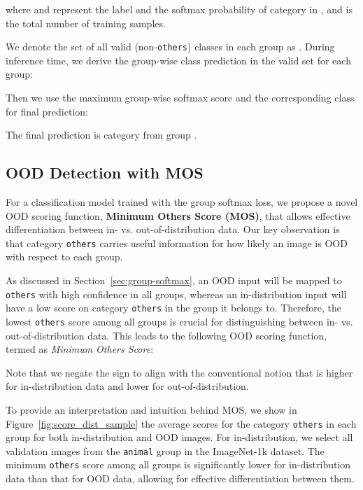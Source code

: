\documentclass[final]{cvpr}
\begin{document}
where  and  represent the label and the softmax probability of category  in , and  is the total number of training samples.

 We denote the set of all valid (non-\texttt{others}) classes in each group as . During inference time, we derive the group-wise class prediction in the valid set for each group:

\vspace{-0.2cm}

Then we use the maximum group-wise softmax score and the corresponding class for final prediction:
\vspace{-0.2cm}

The final prediction is category  from group .






\subsection{OOD Detection with MOS}
\label{sec:gs-ood}
For a classification model trained with the group softmax loss, we propose a novel OOD scoring function, \textbf{Minimum Others Score (MOS)}, that allows effective differentiation between in- vs. out-of-distribution data. Our key observation is that category \texttt{others} carries useful information for how likely an image is OOD with respect to each group. 

As discussed in Section~\ref{sec:group-softmax}, an OOD input will be mapped to \texttt{others} with high confidence in all groups, whereas an in-distribution input will have a low score on category \texttt{others} in the group it belongs to. Therefore, the lowest \texttt{others} score among all groups is crucial for distinguishing between in- vs. out-of-distribution data. This leads to the following OOD scoring function, termed as \emph{Minimum Others Score}:
\vspace{-0.2cm}

Note that we negate the sign to align with the conventional notion that  is higher for in-distribution data and lower for out-of-distribution.


To provide an interpretation and intuition behind MOS, we show in Figure~\ref{fig:score_dist_sample} the average scores for the category \texttt{others} in each group for both in-distribution and OOD images. For in-distribution, we select all validation images from the \texttt{animal} group in the ImageNet-1k dataset. The minimum \texttt{others} score among all groups is significantly lower for in-distribution data than that for OOD data, allowing for effective differentiation between them.  
\end{document}
